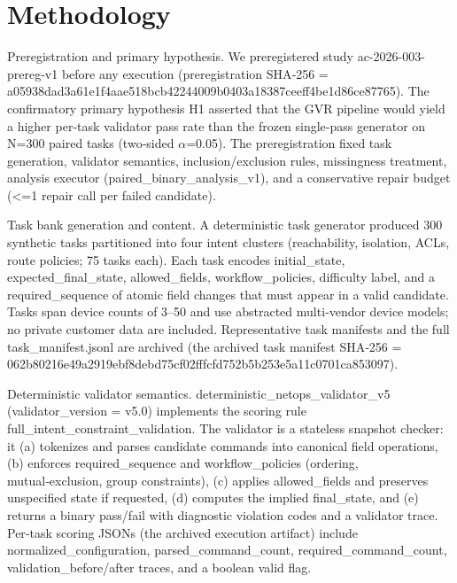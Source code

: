 \documentclass[conference]{IEEEtran}
\begin{document}
\section{Methodology}
Preregistration and primary hypothesis. We preregistered study ac-2026-003-prereg-v1 before any execution (preregistration SHA‑256 = a05938da\allowbreak{}d3a61e1f\allowbreak{}4aae518b\allowbreak{}cb422440\allowbreak{}09b0403a\allowbreak{}18387cee\allowbreak{}ff4be1d8\allowbreak{}6ce87765). The confirmatory primary hypothesis H1 asserted that the GVR pipeline would yield a higher per‑task validator pass rate than the frozen single‑pass generator on N=300 paired tasks (two‑sided \ensuremath{\alpha}=0.05). The preregistration fixed task generation, validator semantics, inclusion/exclusion rules, missingness treatment, analysis executor (paired\_binary\_analysis\_v1), and a conservative repair budget (<=1 repair call per failed candidate).

Task bank generation and content. A deterministic task generator produced 300 synthetic tasks partitioned into four intent clusters (reachability, isolation, ACLs, route policies; 75 tasks each). Each task encodes initial\_state, expected\_final\_state, allowed\_fields, workflow\_policies, difficulty label, and a required\_sequence of atomic field changes that must appear in a valid candidate. Tasks span device counts of 3--50 and use abstracted multi‑vendor device models; no private customer data are included. Representative task manifests and the full task\_manifest.jsonl are archived (the archived task manifest SHA‑256 = 062b8021\allowbreak{}6e49a291\allowbreak{}9ebf8deb\allowbreak{}d75cf02f\allowbreak{}ffcfd752\allowbreak{}b5b253e5\allowbreak{}a11c0701\allowbreak{}ca853097).

Deterministic validator semantics. deterministic\_netops\_validator\_v5 (validator\_version = v5.0) implements the scoring rule full\_intent\_constraint\_validation. The validator is a stateless snapshot checker: it (a) tokenizes and parses candidate commands into canonical field operations, (b) enforces required\_sequence and workflow\_policies (ordering, mutual‑exclusion, group constraints), (c) applies allowed\_fields and preserves unspecified state if requested, (d) computes the implied final\_state, and (e) returns a binary pass/fail with diagnostic violation codes and a validator trace. Per‑task scoring JSONs (the archived execution artifact) include normalized\_configuration, parsed\_command\_count, required\_command\_count, validation\_before/after traces, and a boolean valid flag.
\end{document}
